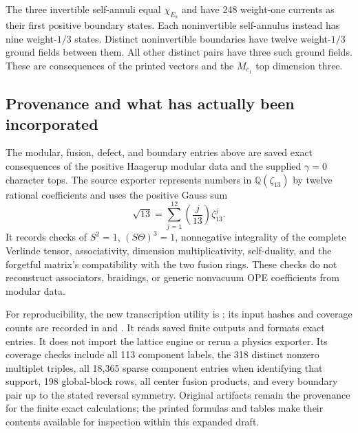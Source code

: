 The three invertible self-annuli equal $\chi_{E_8}$ and have
248 weight-one currents as their first positive boundary states.
Each noninvertible self-annulus instead has nine weight-$1/3$
states. Distinct noninvertible boundaries have twelve
weight-$1/3$ ground fields between them. All other distinct pairs
have three such ground fields. These are consequences of the
printed vectors and the $M_{c_1}$ top dimension three.

\subsection{Provenance and what has actually been incorporated}

The modular, fusion, defect, and boundary entries above are saved
exact consequences of the positive Haagerup modular data and the
supplied $\gamma=0$ character tops. The source exporter represents
numbers in $\mathbb Q(\zeta_{13})$ by twelve rational coefficients
and uses the positive Gauss sum
\[
 \sqrt{13}=\sum_{j=1}^{12}\left(\frac j{13}\right)\zeta_{13}^j.
\]
It records checks of $S^2=1$, $(S\Theta)^3=1$, nonnegative
integrality of the complete Verlinde tensor, associativity,
dimension multiplicativity, self-duality, and the forgetful
matrix's compatibility with the two fusion rings. These checks
do not reconstruct associators, braidings, or generic nonvacuum
OPE coefficients from modular data.

For reproducibility, the new transcription utility is
; its input
hashes and coverage counts are recorded in
 and
. It reads saved finite outputs and
formats exact entries. It does not import the lattice engine or
rerun a physics exporter. Its coverage checks include all 113
component labels, the 318 distinct nonzero multiplet triples,
all 18,365 sparse component entries when identifying that support,
198 global-block rows, all center fusion products, and every
boundary pair up to the stated reversal symmetry. Original
artifacts remain the provenance for the finite exact calculations;
the printed formulas and tables make their contents available for
inspection within this expanded draft.
